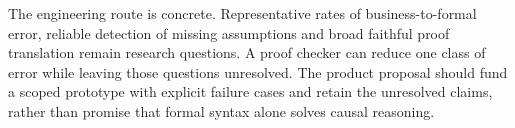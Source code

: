 The engineering route is concrete. Representative rates of business-to-formal
error, reliable detection of missing assumptions and broad faithful proof
translation remain research questions. A proof checker can reduce one class of
error while leaving those questions unresolved. The product proposal should
fund a scoped prototype with explicit failure cases and retain the unresolved
claims, rather than promise that formal syntax alone solves causal reasoning.
\citep{exec14_ident_contract}
\label{exec14:llm-identification-end}
